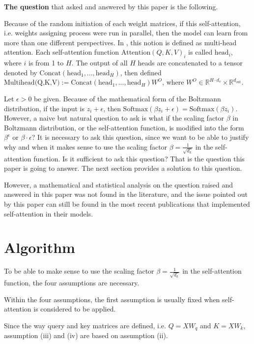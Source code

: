 \documentclass{article}
\theoremstyle{plain}
\theoremstyle{plain} %
\theoremstyle{definition}  %
\theoremstyle{remark}  %
\theoremstyle{plain}
\begin{document}
\textbf{The question} that asked and answered by this paper is the following.


Because of the random initiation of each weight matrices, if this self-attention, i.e. weights assigning process were run in parallel, then the model can learn from more than one different perspectives. In \cite{vaswani2017attention}, this notion is defined as multi-head attention. Each self-attention function  $\text{Attention}\left(Q,K,V\right)_i$ is called $\text{head}_i$, where $i$ is from 1 to $H$. The output of all $H$ heads are concatenated to a tensor denoted by $\text{Concat}\left(\text{head}_1,...,\text{head}_H \right)$, then defined $\text{Multihead(Q,K,V)}:= \text{Concat}\left(\text{head}_1,...,\text{head}_H \right) W^O$, where $W^O\in \mathbb{R}^{H\cdot d_v}\times \mathbb{R}^{d_{\text{out}}}$.


Let $\epsilon>0$ be given. Because of the mathematical form of the Boltzmann distribution, if the input is $z_i+\epsilon$, then $\text{Softmax}(\beta z_i+\epsilon)=\text{Softmax}(\beta z_i).$ However, a naive but natural question to ask is what if the scaling factor $\beta$ in Boltzmann distribution, or the self-attention function, is modified into the form $\beta^\epsilon$ or $\beta\cdot\epsilon$? It is necessary to ask this question, since we want to be able to justify why and when it makes sense to use the scaling factor $\beta=\frac{1}{\sqrt{d_k}}$ in the self-attention function. Is it sufficient to ask this question? That is the question this paper is going to answer. The next section provides a solution to this question.

However, a mathematical and statistical analysis on the question raised and answered in this paper was not found in the literature, and the issue pointed out by this paper can still be found in the most recent publications that implemented self-attention in their models.

\section{Algorithm}

To be able to make sense to use the scaling factor $\beta=\frac{1}{\sqrt{d_k}}$ in the self-attention function, the four assumptions are necessary. 

Within the four assumptions, the first assumption is usually fixed when self-attention is considered to be applied. 


Since the way query and key matrices are defined, i.e. $Q=XW_q$ and $K=XW_k$, assumption (iii) and (iv) are based on assumption (ii).
\end{document}
